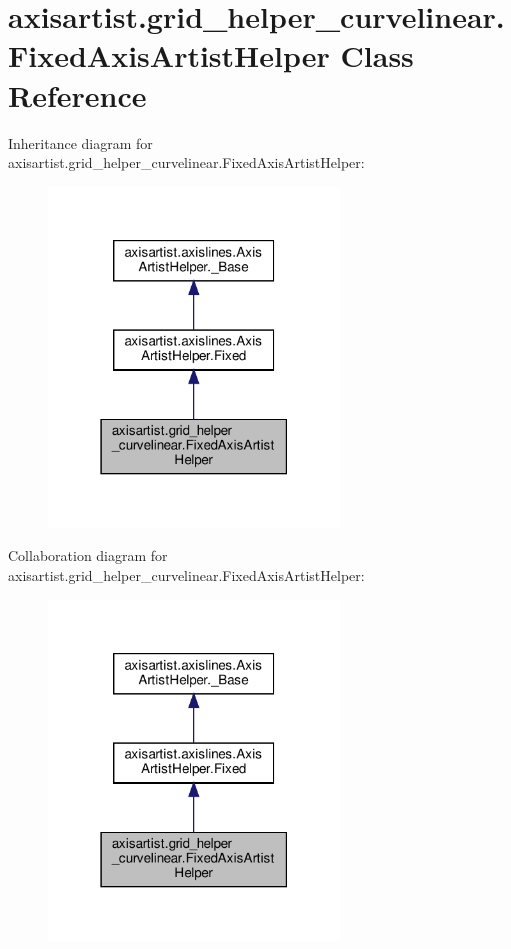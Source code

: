 \hypertarget{classaxisartist_1_1grid__helper__curvelinear_1_1FixedAxisArtistHelper}{}\section{axisartist.\+grid\+\_\+helper\+\_\+curvelinear.\+Fixed\+Axis\+Artist\+Helper Class Reference}
\label{classaxisartist_1_1grid__helper__curvelinear_1_1FixedAxisArtistHelper}


Inheritance diagram for axisartist.\+grid\+\_\+helper\+\_\+curvelinear.\+Fixed\+Axis\+Artist\+Helper\+:
\nopagebreak
\begin{figure}[H]
\begin{center}
\leavevmode
\includegraphics[width=219pt]{classaxisartist_1_1grid__helper__curvelinear_1_1FixedAxisArtistHelper__inherit__graph}
\end{center}
\end{figure}


Collaboration diagram for axisartist.\+grid\+\_\+helper\+\_\+curvelinear.\+Fixed\+Axis\+Artist\+Helper\+:
\nopagebreak
\begin{figure}[H]
\begin{center}
\leavevmode
\includegraphics[width=219pt]{classaxisartist_1_1grid__helper__curvelinear_1_1FixedAxisArtistHelper__coll__graph}
\end{center}
\end{figure}
